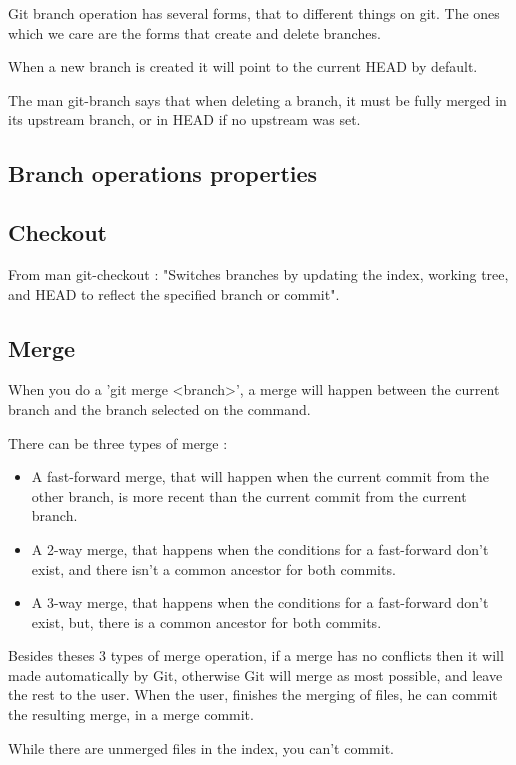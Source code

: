 Git branch operation has several forms, that to different things on git.
The ones which we care are the forms that create and delete branches. \par
When a new branch is created it will point to the current HEAD by default.
\par


The man git-branch says that when deleting a branch, it must be fully
merged in its upstream branch, or in HEAD if no upstream was set. \par

\subsection{Branch operations properties }


\subsection{Checkout}

From man git-checkout : "Switches branches by updating the index, 
working tree, and HEAD to reflect the specified branch or commit". \par

\subsection{Merge}

When you do a 'git merge <branch>', a merge will happen between the current
branch and the branch selected on the command. \par
There can be three types of merge : 
\begin{itemize}
\item A fast-forward merge, that will happen when 
the current commit from the other
branch, is more recent than the current commit from the current branch.
\item A 2-way merge, that happens when the conditions for a fast-forward
don't exist, and there isn't a common ancestor for both commits.
\item A 3-way merge, that happens when the conditions for a fast-forward
don't exist, but, there is a common ancestor for both commits.
\end{itemize}
Besides theses 3 types of merge operation, if a merge has no conflicts then
it will made automatically by Git, otherwise Git will merge as most possible,
and leave the rest to the user. When the user, finishes the merging of files, he
can commit the resulting merge, in a merge commit. \par
While there are unmerged files in the index, you can't commit.
